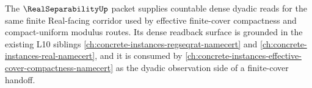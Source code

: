 The $\RealSeparabilityUp$ packet supplies countable dense dyadic reads for the same finite Real-facing corridor used by effective finite-cover compactness and compact-uniform modulus routes. Its dense readback surface is grounded in the existing L10 siblings \autoref{ch:concrete-instances-regseqrat-namecert} and \autoref{ch:concrete-instances-real-namecert}, and it is consumed by \autoref{ch:concrete-instances-effective-cover-compactness-namecert} as the dyadic observation side of a finite-cover handoff.
